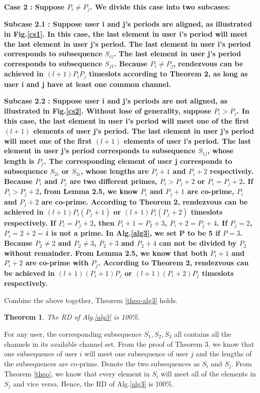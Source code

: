 \documentclass[10pt, conference, letterpaper]{IEEEtran}
\newtheorem{theorem}{Theorem}
\begin{document}
\begin{IEEEproof}
\bfseries Case 2 \mdseries: Suppose $P_i \ne P_j$.  We divide this case into two subcases:

\bfseries Subcase 2.1 \mdseries: Suppose user i and j's periods are aligned, as illustrated in Fig.\ref{cs1}. In this case, the last
element in user i's period will meet the last element in user j's period. The last element in user i's period corresponds to subsequence $S_{i1}$. The last element in user j's period corresponds to subsequence $S_{j1}$. Because $P_i \ne P_j$, rendezvous can be achieved in $(l + 1)P_iP_j$ timeslots according to Theorem 2, as long as user i and j have at least one common channel.

\bfseries Subcase 2.2 \mdseries: Suppose user i and j's periods are not aligned, as illustrated in Fig.\ref{cs2}. Without lose of generality, suppose $P_i > P_j$. In this case, the last element in user i's period will meet one of the first $(l + 1)$ elements of user j's period. The last element in user j's period will meet one of the first $(l + 1)$ elements of user i's period. The last element in user j's period corresponds to subsequence $S_{1j}$, whose length is $P_j$. The corresponding element of user j corresponds to subsequence $S_{2i}$ or $S_{3i}$, whose lengths are $P_i +1$ and $P_i +2$ respectively. Because $P_i$ and $P_j$ are two different primes, $P_i > P_j +2$ or $P_i = P_j +2$. If $P_i > P_j + 2$, from Lemma 2.5, we know $P_i$ and $P_j + 1$ are co-prime, $P_i$ and $P_j +2 $ are co-prime. According to Theorem 2, rendezvous can be achieved in $(l + 1)P_i(P_j+1)$ or $(l + 1)P_i(P_j+2)$ timeslots respectively. If $P_i = P_j + 2$, then $P_i + 1 = P_2 + 3$, $P_i + 2 = P_j + 4$. If $P_j = 2$, $P_i = 2 + 2=4$ is not a prime. In Alg.\ref{alg3}, we set P to be 5 if $P=3$. Because $P_2 \ne 2$ and $P_2 \ne 3$, $P_2 + 3$ and $P_2 + 4$ can not be divided by $P_2$ without remainder. From Lemma 2.5, we know that both $P_i + 1$ and $P_i +2$ are co-prime with $P_j$. According to Theorem 2, rendezvous can be achieved in $(l + 1)(P_i + 1)P_j$ or $(l + 1)(P_i+2)P_j$ timeslots respectively.

Combine the above together, Theorem \ref{theo-alg3} holds.

\end{IEEEproof}

\begin{theorem}
\label{theo-rd-alg3}
The RD of Alg.\ref{alg3} is 100\%.
\end{theorem}

\begin{IEEEproof}
For any user, the corresponding subsequence $S_1,S_2,S_3$ all contains all the channels in its available channel set. From the proof of Theorem 3, we know that one subsequence of user $i$ will meet one subsequence of user $j$ and the lengths of the subsequences are co-prime. Denote the two subsequences as $S_i$ and $S_j$. From Theorem \ref{theo}, we know that every element in $S_i$ will meet all of the elements in $S_j$ and vice versa. Hence, the RD of Alg.\ref{alg3} is 100\%.
\end{IEEEproof}
\end{document}
